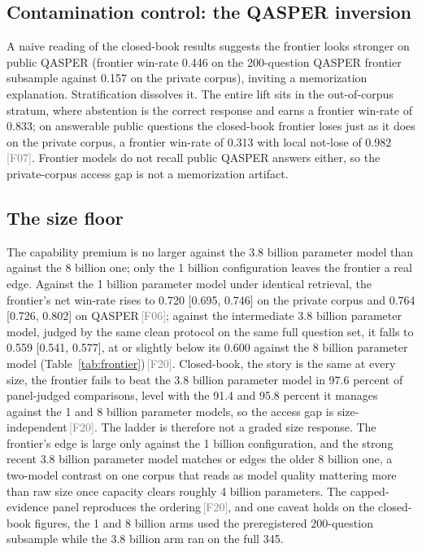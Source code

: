 \documentclass[11pt]{article}
\newcommand{\rcpt}[1]{\textcolor{gray}{\,\textsf{\scriptsize[#1]}}}
\begin{document}
\subsection{Contamination control: the QASPER inversion}
\label{sec:contamination}

A naive reading of the closed-book results suggests the frontier looks stronger on public QASPER (frontier win-rate 0.446 on the 200-question QASPER frontier subsample against 0.157 on the private corpus), inviting a memorization explanation. Stratification dissolves it. The entire lift sits in the out-of-corpus stratum, where abstention is the correct response and earns a frontier win-rate of 0.833; on answerable public questions the closed-book frontier loses just as it does on the private corpus, a frontier win-rate of 0.313 with local not-lose of 0.982\rcpt{F07}. Frontier models do not recall public QASPER answers either, so the private-corpus access gap is not a memorization artifact.

\subsection{The size floor}
The capability premium is no larger against the 3.8 billion parameter model than against the 8 billion one; only the 1 billion configuration leaves the frontier a real edge. Against the 1 billion parameter model under identical retrieval, the frontier's net win-rate rises to 0.720 [0.695, 0.746] on the private corpus and 0.764 [0.726, 0.802] on QASPER\rcpt{F06}; against the intermediate 3.8 billion parameter model, judged by the same clean protocol on the same full question set, it falls to 0.559 [0.541, 0.577], at or slightly below its 0.600 against the 8 billion parameter model (Table~\ref{tab:frontier})\rcpt{F20}. Closed-book, the story is the same at every size, the frontier fails to beat the 3.8 billion parameter model in 97.6 percent of panel-judged comparisons, level with the 91.4 and 95.8 percent it manages against the 1 and 8 billion parameter models, so the access gap is size-independent\rcpt{F20}. The ladder is therefore not a graded size response. The frontier's edge is large only against the 1 billion configuration, and the strong recent 3.8 billion parameter model matches or edges the older 8 billion one, a two-model contrast on one corpus that reads as model quality mattering more than raw size once capacity clears roughly 4 billion parameters. The capped-evidence panel reproduces the ordering\rcpt{F20}, and one caveat holds on the closed-book figures, the 1 and 8 billion arms used the preregistered 200-question subsample while the 3.8 billion arm ran on the full 345.
\end{document}
